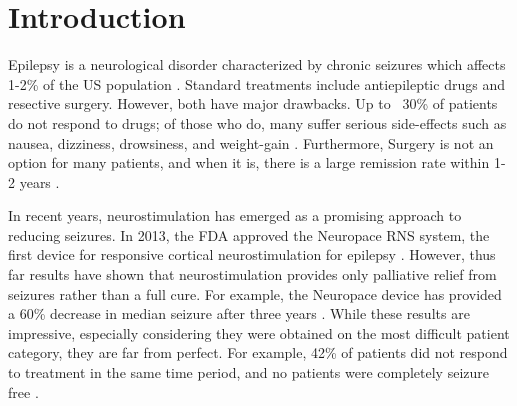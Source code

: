 \documentclass[11pt,a4paper,final]{article}
\begin{document}


\section{Introduction \label{intro}}

Epilepsy is a neurological disorder characterized by chronic seizures which affects 1-2\% of the US population \citep{begley00}.
Standard treatments include antiepileptic drugs and resective surgery.
However, both have major drawbacks.
Up to ~30\% of patients do not respond to drugs; of those who do, many suffer serious side-effects such as nausea, dizziness, drowsiness, and weight-gain \citep{brodie96}.
Furthermore, Surgery is not an option for many patients, and when it is, there is a large remission rate within 1-2 years  \citep{engel03}.

In recent years, neurostimulation has emerged as a promising approach to reducing seizures.
In 2013, the FDA approved the Neuropace RNS system, the first device for responsive cortical neurostimulation for epilepsy \citep{sun08}.
However, thus far results have shown that neurostimulation provides only palliative relief from seizures rather than a full cure.
For example, the Neuropace device has provided a 60\% decrease in median seizure after three years  \citep{bergey15,morrell16}.
While these results are impressive, especially considering they were obtained on the most difficult patient category, they are far from perfect.
For example, 42\% of patients did not respond to treatment in the same time period, and no patients were completely seizure free \citep{bergey15}.
\end{document}
